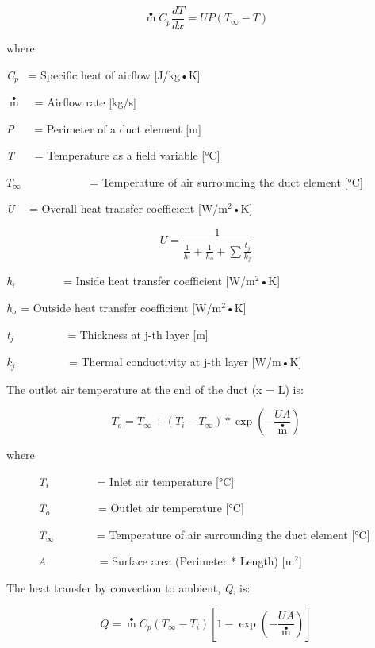 \begin{equation}
\mathop m\limits^ \bullet  {C_p}\frac{{dT}}{{dx}} = UP(T{}_\infty  - T)
\end{equation}

where

\emph{C\(_{p}\)}~ = Specific heat of airflow {[}J/kg•K{]}

\(\mathop m\limits^ \bullet\) ~ = Airflow rate {[}kg/s{]}

\emph{P}~~~ = Perimeter of a duct element {[}m{]}

\emph{T}~~~ = Temperature as a field variable {[}°C{]}

\(T{}_\infty\) ~~~~~~~~~~~ = Temperature of air surrounding the duct element {[}°C{]}

\emph{U}~~ = Overall heat transfer coefficient {[}W/m\(^{2}\)•K{]}

\begin{equation}
U = \frac{1}{{\frac{1}{{{h_i}}} + \frac{1}{{{h_o}}} + \sum {\frac{{{t_j}}}{{{k_j}}}} }}
\end{equation}

\emph{h\(_{i}\)}~~~~~~~~ = Inside heat transfer coefficient {[}W/m\(^{2}\)•K{]}

\emph{h\(_{o}\)}\(_{ }\) = Outside heat transfer coefficient {[}W/m\(^{2}\)•K{]}

\emph{t\(_{j}\)}~~~~~~~~~ = Thickness at j-th layer {[}m{]}

\emph{k\(_{j}\)}~~~~~~~~~ = Thermal conductivity at j-th layer {[}W/m•K{]}

The outlet air temperature at the end of the duct (x = L) is:

\begin{equation}
{T_o} = {T_\infty } + ({T_i} - {T_\infty })*\exp \left( { - \frac{{UA}}{{\mathop {m{C_p}}\limits^ \bullet  }}} \right)
\end{equation}

where

~~~~~ \emph{T\(_{i}\)}~~~~~~~~ = Inlet air temperature {[}°C{]}

~~~~~ \emph{T\(_{o}\)}~~~~~~~~ = Outlet air temperature {[}°C{]}

~~~~~ \emph{T\(_{∞}\)}~~~~~~~ = Temperature of air surrounding the duct element {[}°C{]}

~~~~~ \emph{A}~~~~~~~~~ = Surface area (Perimeter * Length) {[}m\(^{2}\){]}

The heat transfer by convection to ambient, \emph{Q}, is:

\begin{equation}
Q = \mathop m\limits^ \bullet  {C_p}({T_\infty } - {T_i})\left[ {1 - \exp \left( { - \frac{{UA}}{{\mathop {m{C_p}}\limits^ \bullet  }}} \right)} \right]
\end{equation}

